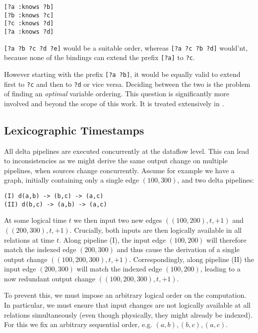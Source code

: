 \documentclass[../index.tex]{subfiles}
\begin{document}
\begin{lstlisting}[language=datalog, style=colorlog]
[?a :knows ?b]
[?b :knows ?c]
[?c :knows ?d]
[?a :knows ?d]
\end{lstlisting}

\texttt{[?a ?b ?c ?d ?e]} would be a suitable order, whereas
\texttt{[?a ?c ?b ?d]} would'nt, because none of the bindings can
extend the prefix \texttt{[?a]} to \texttt{?c}.

However starting with the prefix \texttt{[?a ?b]}, it would be equally
valid to extend first to \texttt{?c} and then to \texttt{?d} or vice
versa. Deciding between the two is the problem of finding an
\emph{optimal} variable ordering. This question is significantly more
involved and beyond the scope of this work. It is treated extensively
in \cite{abo2016faq}.

\subsection{Lexicographic Timestamps} \label{impl-altneu}

All delta pipelines are executed concurrently at the dataflow
level. This can lead to inconsistencies as we might derive the same
output change on multiple pipelines, when sources change
concurrently. Assume for example we have a graph, initially containing
only a single edge $(100,300)$, and two delta pipelines:

\begin{verbatim}
(I) d(a,b) -> (b,c) -> (a,c)
(II) d(b,c) -> (a,b) -> (a,c)
\end{verbatim}

At some logical time $t$ we then input two new edges
$((100,200),t,+1)$ and $((200,300),t,+1)$. Crucially, both inputs are
then logically available in all relations at time $t$. Along pipeline
(I), the input edge $(100,200)$ will therefore match the indexed edge
$(200,300)$ and thus cause the derivation of a single output change
$((100,200,300),t,+1)$. Correspondingly, along pipeline (II) the input
edge $(200,300)$ will match the indexed edge $(100,200)$, leading to a
now redundant output change $((100,200,300),t,+1)$.

To prevent this, we must impose an arbitrary logical order on the
computation. In particular, we must ensure that input changes are not
logically available at all relations simultaneously (even though
physically, they might already be indexed). For this we fix an
arbitrary sequential order, e.g. $(a,b),(b,c),(a,c)$.
\end{document}
